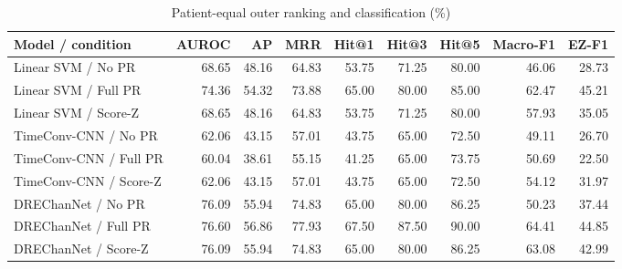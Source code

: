 \begin{table}[t]
\centering
\caption{Patient-equal outer ranking and classification (\%)}
\small
\begin{tabular}{lrrrrrrrr}
\toprule
Model / condition & AUROC & AP & MRR & Hit@1 & Hit@3 & Hit@5 & Macro-F1 & EZ-F1 \\
\midrule
Linear SVM / No PR & 68.65 & 48.16 & 64.83 & 53.75 & 71.25 & 80.00 & 46.06 & 28.73 \\
Linear SVM / Full PR & 74.36 & 54.32 & 73.88 & 65.00 & 80.00 & 85.00 & 62.47 & 45.21 \\
Linear SVM / Score-Z & 68.65 & 48.16 & 64.83 & 53.75 & 71.25 & 80.00 & 57.93 & 35.05 \\
TimeConv-CNN / No PR & 62.06 & 43.15 & 57.01 & 43.75 & 65.00 & 72.50 & 49.11 & 26.70 \\
TimeConv-CNN / Full PR & 60.04 & 38.61 & 55.15 & 41.25 & 65.00 & 73.75 & 50.69 & 22.50 \\
TimeConv-CNN / Score-Z & 62.06 & 43.15 & 57.01 & 43.75 & 65.00 & 72.50 & 54.12 & 31.97 \\
DREChanNet / No PR & 76.09 & 55.94 & 74.83 & 65.00 & 80.00 & 86.25 & 50.23 & 37.44 \\
DREChanNet / Full PR & 76.60 & 56.86 & 77.93 & 67.50 & 87.50 & 90.00 & 64.41 & 44.85 \\
DREChanNet / Score-Z & 76.09 & 55.94 & 74.83 & 65.00 & 80.00 & 86.25 & 63.08 & 42.99 \\
\bottomrule
\end{tabular}
\end{table}
